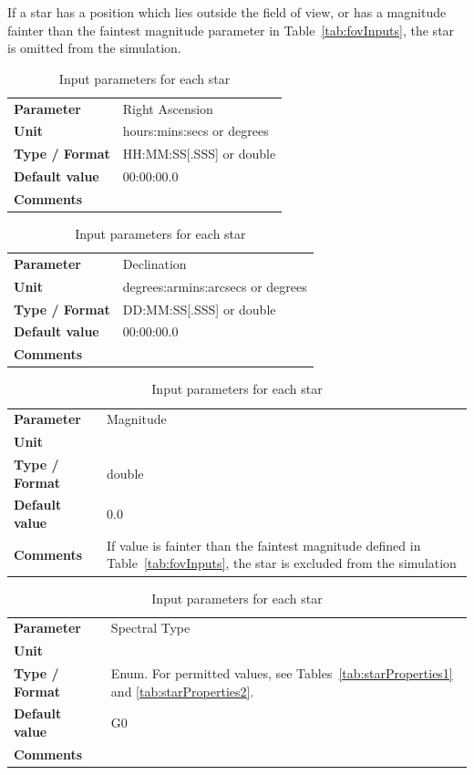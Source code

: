 \documentclass[11pt]{article}      %
\begin{document}
If a star has a position which lies outside the field of view, or has a magnitude fainter than the faintest magnitude parameter in Table~\ref{tab:fovInputs}, the star is omitted from the simulation.

\begin{table}[hb]
  \caption{Input parameters for each star}

  \begin{tabular}{| l | p{13cm} |}
    \hline 
    {\bf Parameter} & Right Ascension \\
    {\bf Unit} & hours:mins:secs or degrees\\
    {\bf Type / Format} & HH:MM:SS[.SSS] or double\\
    {\bf Default value} & 00:00:00.0\\
    {\bf Comments} & \\
    \hline
  \end{tabular}
  \bigskip

  \begin{tabular}{| l | p{13cm} |}
    \hline 
    {\bf Parameter} & Declination\\
    {\bf Unit} & degrees:armins:arcsecs or degrees\\
    {\bf Type / Format} & DD:MM:SS[.SSS] or double\\
    {\bf Default value} & 00:00:00.0\\
    {\bf Comments} & \\
    \hline
  \end{tabular}
  \bigskip

  \begin{tabular}{| l | p{13cm} |}
    \hline 
    {\bf Parameter} & Magnitude\\
    {\bf Unit} & \\
    {\bf Type / Format} & double\\
    {\bf Default value} & 0.0\\
    {\bf Comments} & If value is fainter than the faintest magnitude defined in Table~\ref{tab:fovInputs}, the star is excluded from the simulation\\
    \hline
  \end{tabular}
  \bigskip

  \begin{tabular}{| l | p{13cm} |}
    \hline 
    {\bf Parameter} & Spectral Type\\
    {\bf Unit} &\\
    {\bf Type / Format} & Enum. For permitted values, see Tables~\ref{tab:starProperties1} and \ref{tab:starProperties2}.\\
    {\bf Default value} & G0\\
    {\bf Comments} & \\
    \hline
  \end{tabular}
  \bigskip

  \label{tab:star}
\end{table}
\end{document}
